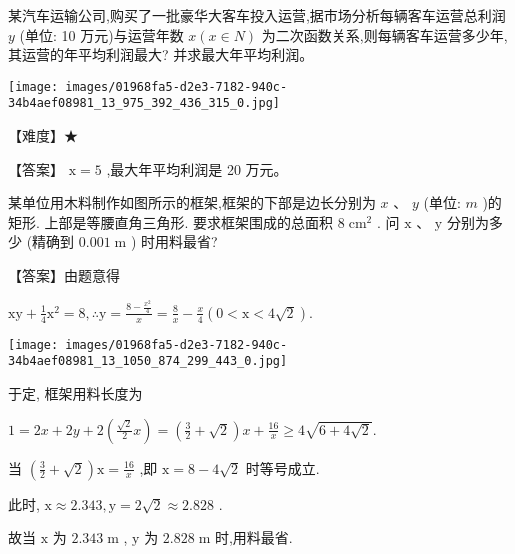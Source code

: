 \documentclass[11pt,a4paper]{article}
\begin{document}
\begin{problem} 
某汽车运输公司,购买了一批豪华大客车投入运营,据市场分析每辆客车运营总利润 \(\displaystyle y\) (单位: 10 万元)与运营年数 \(\displaystyle x\left( {x \in  N}\right)\) 为二次函数关系,则每辆客车运营多少年,其运营的年平均利润最大? 并求最大年平均利润。


\texttt{[image: images/01968fa5-d2e3-7182-940c-34b4aef08981\_13\_975\_392\_436\_315\_0.jpg]}

\begin{jiexi}[25]

【难度】★

【答案】 \(\displaystyle \mathrm{x} = 5\) ,最大年平均利润是 20 万元。


\end{jiexi}
\end{problem}
\sclear
\begin{problem} 
某单位用木料制作如图所示的框架,框架的下部是边长分别为 \(\displaystyle x\) 、 \(\displaystyle y\) (单位: \(\displaystyle m\) )的矩形. 上部是等腰直角三角形. 要求框架围成的总面积 \(\displaystyle 8{\mathrm{\;{cm}}}^{2}\) . 问 \(\displaystyle \mathrm{x}\text{ 、 }\mathrm{y}\) 分别为多少 (精确到 \(\displaystyle {0.001}\mathrm{\;m}\) ) 时用料最省? 
\begin{jiexi}[45]
【答案】由题意得

\(\displaystyle \mathrm{{xy}} + \frac{1}{4}{\mathrm{x}}^{2} = 8,\therefore \mathrm{y} = \frac{8 - \frac{{x}^{2}}{4}}{x} = \frac{8}{x} - \frac{x}{4}\left( {0 < \mathrm{x} < 4\sqrt{2}}\right) .\)


\texttt{[image: images/01968fa5-d2e3-7182-940c-34b4aef08981\_13\_1050\_874\_299\_443\_0.jpg]}

 

于定, 框架用料长度为

\(\displaystyle 1 = {2x} + {2y} + 2\left( {\frac{\sqrt{2}}{2}x}\right)  = \left( {\frac{3}{2} + \sqrt{2}}\right) x + \frac{16}{x} \geq  4\sqrt{6 + 4\sqrt{2}}.\)

当 \(\displaystyle \left( {\frac{3}{2} + \sqrt{2}}\right) \mathrm{x} = \frac{16}{x}\) ,即 \(\displaystyle \mathrm{x} = 8 - 4\sqrt{2}\) 时等号成立.

此时, \(\displaystyle \mathrm{x} \approx  {2.343},\mathrm{y} = 2\sqrt{2} \approx  {2.828}\) .

故当 \(\displaystyle \mathrm{x}\) 为 \(\displaystyle {2.343}\mathrm{\;m}\) , \(\displaystyle \mathrm{y}\) 为 \(\displaystyle {2.828}\mathrm{\;m}\) 时,用料最省.


\end{jiexi}
\end{problem}
\end{document}
